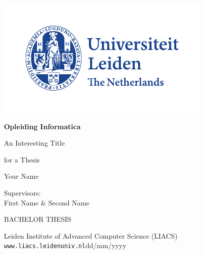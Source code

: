 \thispagestyle{empty}

\includegraphics{logoleiden}

\vspace{-2.5cm}\hfill \begin{huge}\textbf{Opleiding Informatica}\end{huge}

\vspace{5cm}
\begin{Large}
\hfill An Interesting Title

\vspace*{3mm}

\hfill for a Thesis

\vspace*{14mm}

\hfill Your Name
\end{Large}

\vspace*{4.5cm}

\begin{large}

Supervisors:\\
First Name \& Second Name


\vspace*{2.8cm}
BACHELOR THESIS

\vspace*{5mm}
Leiden Institute of Advanced Computer Science (LIACS)\\
\texttt{www.liacs.leidenuniv.nl}\hfill dd/mm/yyyy
\end{large}


